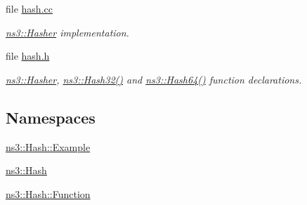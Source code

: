 \begin{DoxyCompactItemize}
file \hyperlink{hash_8cc}{hash.\+cc}
\begin{DoxyCompactList}\small\item\em \hyperlink{classns3_1_1Hasher}{ns3\+::\+Hasher} implementation. \end{DoxyCompactList}\item 
file \hyperlink{hash_8h}{hash.\+h}
\begin{DoxyCompactList}\small\item\em \hyperlink{classns3_1_1Hasher}{ns3\+::\+Hasher}, \hyperlink{group__hash_ga7245e12aa78a81c7d008dd8fba67aeb4}{ns3\+::\+Hash32()} and \hyperlink{group__hash_ga32813ece904f0d68bba1999f8752143a}{ns3\+::\+Hash64()} function declarations. \end{DoxyCompactList}\end{DoxyCompactItemize}
\subsection*{Namespaces}
\begin{DoxyCompactItemize}
\item 
 \hyperlink{namespacens3_1_1Hash_1_1Example}{ns3\+::\+Hash\+::\+Example}
\item 
 \hyperlink{namespacens3_1_1Hash}{ns3\+::\+Hash}
\item 
 \hyperlink{namespacens3_1_1Hash_1_1Function}{ns3\+::\+Hash\+::\+Function}
\end{DoxyCompactItemize}
